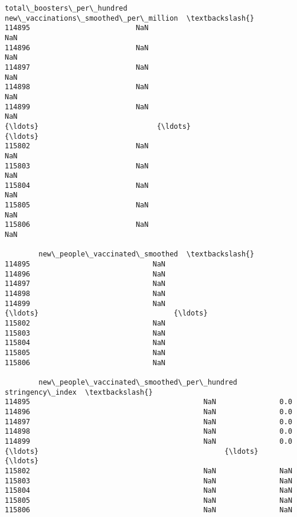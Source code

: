 \documentclass[11pt]{article}
\begin{document}
\begin{tcolorbox}[breakable, size=fbox, boxrule=.5pt, pad at break*=1mm, opacityfill=0]
\begin{Verbatim}[commandchars=\\\{\}]
        total\_boosters\_per\_hundred  new\_vaccinations\_smoothed\_per\_million  \textbackslash{}
114895                         NaN                                    NaN
114896                         NaN                                    NaN
114897                         NaN                                    NaN
114898                         NaN                                    NaN
114899                         NaN                                    NaN
{\ldots}                            {\ldots}                                    {\ldots}
115802                         NaN                                    NaN
115803                         NaN                                    NaN
115804                         NaN                                    NaN
115805                         NaN                                    NaN
115806                         NaN                                    NaN

        new\_people\_vaccinated\_smoothed  \textbackslash{}
114895                             NaN
114896                             NaN
114897                             NaN
114898                             NaN
114899                             NaN
{\ldots}                                {\ldots}
115802                             NaN
115803                             NaN
115804                             NaN
115805                             NaN
115806                             NaN

        new\_people\_vaccinated\_smoothed\_per\_hundred  stringency\_index  \textbackslash{}
114895                                         NaN               0.0
114896                                         NaN               0.0
114897                                         NaN               0.0
114898                                         NaN               0.0
114899                                         NaN               0.0
{\ldots}                                            {\ldots}               {\ldots}
115802                                         NaN               NaN
115803                                         NaN               NaN
115804                                         NaN               NaN
115805                                         NaN               NaN
115806                                         NaN               NaN


\end{Verbatim}
\end{tcolorbox}
\end{document}
